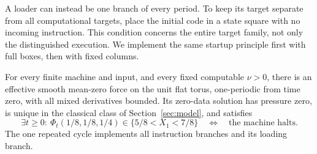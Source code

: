 A loader can instead be one branch of every period. To keep its target
separate from all computational targets, place the initial code in a state
square with no incoming instruction. This condition concerns the entire
target family, not only the distinguished execution. We implement the
same startup principle first with full boxes, then with fixed columns.

\begin{theorem}
\label{ba:periodic-torus}
For every finite machine and input, and every fixed computable $\nu>0$,
there is an effective smooth mean-zero force on the unit flat torus,
one-periodic from time zero, with all mixed derivatives bounded.  Its
zero-data solution has pressure zero, is unique in the classical class
of Section~\ref{sec:model}, and satisfies
\[
 \exists t\ge0:\ \Phi_t(1/8,1/8,1/4)
             \in\{5/8<X_1<7/8\}
 \quad\Longleftrightarrow\quad\text{the machine halts}.
\]
The one repeated cycle implements all instruction branches and its
loading branch.
\end{theorem}
